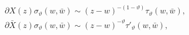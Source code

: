 \begin{equation}
\label{opes}
\begin{array}{l}
\partial X(z) \sigma_{\vartheta}(w,\bar{w}) \sim
(z-w)^{-(1-\vartheta)}\tau_{\vartheta}(w,\bar{w}), \\
\partial \bar{X}(z) \sigma_{\vartheta}(w,\bar{w}) \sim
(z-w)^{-\vartheta}\tau'_{\vartheta}(w,\bar{w}),
\end{array}
\end{equation}


